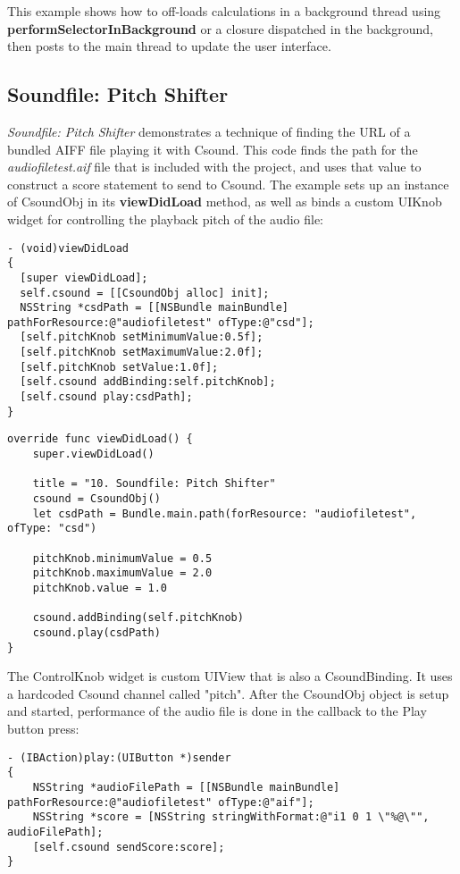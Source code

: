 \documentclass[11pt]{article}
\begin{document}
This example shows how to off-loads calculations in a background thread using \textbf{performSelectorInBackground} or a closure dispatched in the background, then posts to the main thread to update the user interface.

\subsection{Soundfile: Pitch Shifter}

\emph{Soundfile: Pitch Shifter} demonstrates a technique of finding the URL of a bundled AIFF file playing it with Csound.  This code finds the path for the \emph{audiofiletest.aif} file that is included with the project, and uses that value to construct a score statement to send to Csound. The example sets up an instance of CsoundObj in its \textbf{viewDidLoad} method, as well as binds a custom UIKnob widget for controlling the playback pitch of the audio file:

\begin{lstlisting}[caption=CsoundObj setup code]
- (void)viewDidLoad
{
  [super viewDidLoad];
  self.csound = [[CsoundObj alloc] init];
  NSString *csdPath = [[NSBundle mainBundle] pathForResource:@"audiofiletest" ofType:@"csd"];
  [self.pitchKnob setMinimumValue:0.5f];
  [self.pitchKnob setMaximumValue:2.0f];
  [self.pitchKnob setValue:1.0f];
  [self.csound addBinding:self.pitchKnob];
  [self.csound play:csdPath];
}
\end{lstlisting}

\begin{lstlisting}[caption=CsoundObj Swift 3 setup code]
override func viewDidLoad() {
    super.viewDidLoad()
    
    title = "10. Soundfile: Pitch Shifter"
    csound = CsoundObj()
    let csdPath = Bundle.main.path(forResource: "audiofiletest", ofType: "csd")
    
    pitchKnob.minimumValue = 0.5
    pitchKnob.maximumValue = 2.0
    pitchKnob.value = 1.0
        
    csound.addBinding(self.pitchKnob)
    csound.play(csdPath)
}
\end{lstlisting}

The ControlKnob widget is custom UIView that is also a CsoundBinding.  It uses a hardcoded Csound channel called "pitch".  After the CsoundObj object is setup and started, performance of the audio file is done in the callback to the Play button press:

\begin{lstlisting}[caption=Play button callback code]
- (IBAction)play:(UIButton *)sender
{
    NSString *audioFilePath = [[NSBundle mainBundle] pathForResource:@"audiofiletest" ofType:@"aif"];
    NSString *score = [NSString stringWithFormat:@"i1 0 1 \"%@\"", audioFilePath];
    [self.csound sendScore:score];
}
\end{lstlisting}
\end{document}
